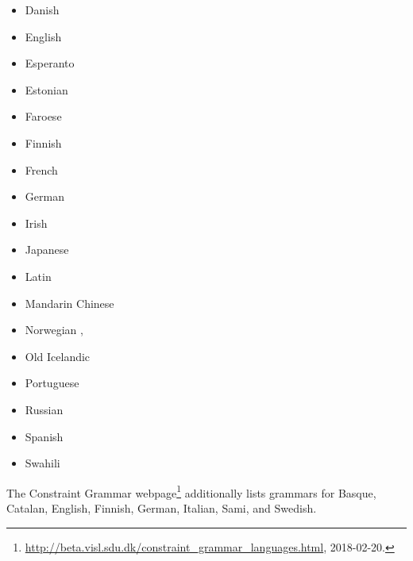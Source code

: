 \begin{itemize}
\item Danish       \citep{Bick2001a-u,BN2007a-u}
\item English     \citep{MIF85a,SN86a,LR87a,Hudson89a,ST91a-u,VHA92a-u,IKKLP92a-u,Coch96a}
\item Esperanto \citep{Bick2009a-u} 
\item Estonian   \citep*{Mueuerisep99a-u,MPMKRU2003a-u}
\item Faroese     \citep{Trosterud2009a-u}
\item Finnish     \citep*{NJL84a-u,JLV86a-u}
\item French       \citep{IKKLP92a-u,Coch96a,Bick2010a-u}
\item German       \citep{Hellwig86a-u,Coch96a,HKMS98a-u,MS98c-u,Hellwig2003a,Hellwig2006a,GK2001a}
\item Irish         \citep{DvG2006a-u}
\item Japanese   \citep*{MIF85a}
\item Latin         \citep{Covington90a}
\item Mandarin Chinese \citep{LW2006a-u,Liu2009a-u}
\item Norwegian               \citep*{HBN2000a-u},
\item Old Icelandic       \citep{Maas77a}
\item Portuguese             \citep{Bick2003a-u} 
\item Russian                   \citep{HZ60a-u,Melcuk64a-u,Covington90a}
\item Spanish                   \citep{Coch96a,Bick2006a-u}
\item Swahili                   \citep{Hurskainen2006a-u}
\end{itemize}
The Constraint Grammar webpage\footnote{%
  \url{http://beta.visl.sdu.dk/constraint_grammar_languages.html}, 2018-02-20.
} additionally lists grammars for
Basque,
Catalan,
English,
Finnish,
German,
Italian,
Sami, and
Swedish.
%
